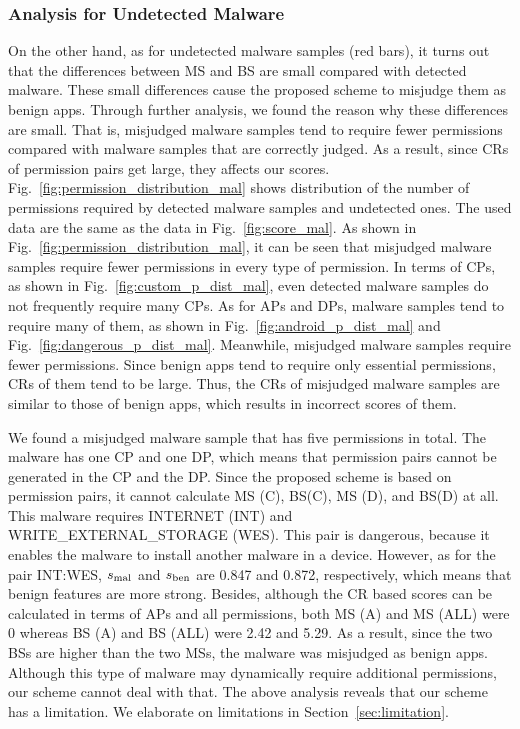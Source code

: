 \documentclass{ieeeaccess}
\newcommand{\myfigurename}{Fig.}
\begin{document}
\subsubsection{Analysis for Undetected Malware}
On the other hand, as for undetected malware samples (red bars), it turns out that the differences between MS and BS are small compared with detected malware.
These small differences cause the proposed scheme to misjudge them as benign apps.
Through further analysis, we found the reason why these differences are small.
That is, misjudged malware samples tend to require fewer permissions compared with malware samples that are correctly judged.
As a result, since CRs of permission pairs get large, they affects our scores.
\myfigurename~\ref{fig:permission_distribution_mal} shows distribution of the number of permissions required by detected malware samples and undetected ones.
The used data are the same as the data in \myfigurename~\ref{fig:score_mal}.
As shown in \myfigurename~\ref{fig:permission_distribution_mal}, it can be seen that misjudged malware samples require fewer permissions in every type of permission.
In terms of CPs, as shown in \myfigurename~\ref{fig:custom_p_dist_mal}, even detected malware samples do not frequently require many CPs.
As for APs and DPs, malware samples tend to require many of them, as shown in \myfigurename~\ref{fig:android_p_dist_mal} and \myfigurename~\ref{fig:dangerous_p_dist_mal}.
Meanwhile, misjudged malware samples require fewer permissions.
Since benign apps tend to require only essential permissions, CRs of them tend to be large.
Thus, the CRs of misjudged malware samples are similar to those of benign apps, which results in incorrect scores of them.

We found a misjudged malware sample that has five permissions in total.
The malware has one CP and one DP, which means that permission pairs cannot be generated in the CP and the DP.
Since the proposed scheme is based on permission pairs, it cannot calculate MS (C), BS(C), MS (D), and BS(D) at all.
This malware requires INTERNET (INT) and WRITE\_EXTERNAL\_STORAGE (WES).
This pair is dangerous, because it enables the malware to install another malware in a device.
However, as for the pair INT:WES, $s_{\mathrm{mal}}$ and $s_{\mathrm{ben}}$ are 0.847 and 0.872, respectively, which means that benign features are more strong.
Besides, although the CR based scores can be calculated in terms of APs and all permissions, both MS (A) and MS (ALL) were 0 whereas BS (A) and BS (ALL) were 2.42 and 5.29.
As a result, since the two BSs are higher than the two MSs, the malware was misjudged as benign apps.  
Although this type of malware may dynamically require additional permissions, our scheme cannot deal with that.
The above analysis reveals that our scheme has a limitation.
We elaborate on limitations in Section~\ref{sec:limitation}.
\end{document}
